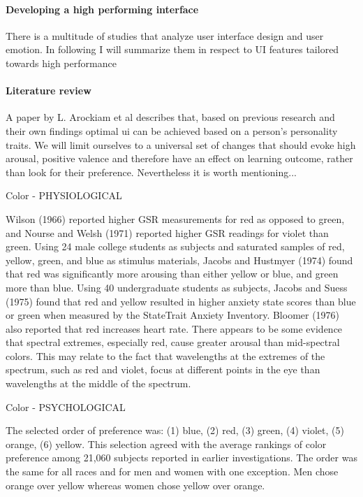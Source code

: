 \clearpage

\paragraph{Developing a high performing interface}

There is a multitude of studies that analyze user interface design and user emotion. In following I will summarize them in respect to UI features tailored towards high performance

\paragraph{Literature review}

A paper by L. Arockiam et al \cite{Arockiam2013} describes that, based on previous research and their own findings optimal ui can be achieved based on a person's personality traits. We will limit ourselves to a universal set of changes that should evoke high arousal, positive valence and therefore have an effect on learning outcome, rather than look for their preference. Nevertheless it is worth mentioning...

Color - PHYSIOLOGICAL

Wilson (1966) reported higher GSR measurements for red as opposed to green, and Nourse and Welsh (1971) reported higher GSR readings for violet than green. Using 24 male college students as subjects and saturated samples of red, yellow, green, and blue as stimulus materials, Jacobs and Hustmyer (1974) found that red was significantly more arousing than either yellow or blue, and green more than blue. Using 40 undergraduate students as subjects, Jacobs and Suess (1975) found that red and yellow resulted in higher anxiety state scores than blue or green when measured by the StateTrait Anxiety Inventory. Bloomer (1976) also reported that red increases heart rate. There appears to be some evidence that spectral extremes, especially red, cause greater arousal than mid-spectral colors. This may relate to the fact that wavelengths at the extremes of the spectrum, such as red and violet, focus at different points in the eye than wavelengths at the middle of the spectrum. \cite{Pert1996}

Color - PSYCHOLOGICAL

The selected order of preference was: (1) blue, (2) red, (3) green, (4) violet, (5) orange, (6) yellow. This selection agreed with the average rankings of color preference among 21,060 subjects reported in earlier investigations. The order was the same for all races and for men and women with one exception. Men chose orange over yellow whereas women chose yellow over orange. \cite{Pert1996}

